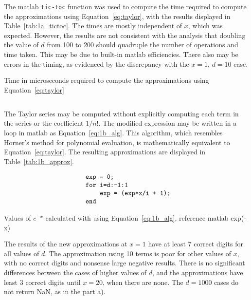 \documentclass[11pt]{article} %
\begin{document}
The matlab \verb!tic-toc! function was used to compute the time required to compute the approximations using  Equation~\ref{eq:taylor}, with the results displayed in Table~\ref{tab:1a_tictoc}. The times are mostly independent of $x$, which was expected. However, the results are not consistent with the analysis that doubling the value of $d$ from 100 to 200 should quadruple the number of operations and time taken. This may be due to built-in matlab efficiencies. There also may be errors in the timing, as evidenced by the discrepancy with the $x=1$, $d=10$ case.  

\begin{table}[h!]
\centering

\caption{Time in microseconds required to compute the approximations using Equation~\ref{eq:taylor}}
\label{tab:1a_tictoc}
\end{table}


\subsection{} %

The Taylor series may be computed without explicitly computing each term in the series or the coefficient $1/n!$. The modified expression may be written in a loop in matlab as Equation~\ref{eq:1b_alg}. This algorithm, which resembles Horner's method for polynomial evaluation, is mathematically equivalent to Equation~\ref{eq:taylor}. The resulting approximations are displayed in Table~\ref{tab:1b_approx}.

\begin{equation}
\begin{array}{l@{}l}
\verb!exp = 0;! \\
\verb!for i=d:-1:1! \\ 
\verb!    exp = (exp*x/i + 1);! \\
\verb!end!
\end{array}
\label{eq:1b_alg}
\end{equation}

\begin{table}[h!]
\centering


\caption{Values of $e^{-x}$ calculated with using Equation~\ref{eq:1b_alg}, reference matlab exp(-x)}
\label{tab:1b_approx}
\end{table}

The results of the new approximations at $x=1$ have at least 7 correct digits for all values of $d$. The  approximation using 10 terms is  poor for other values of $x$, with no correct digits and nonsense large negative results. There is no significant differences between the cases of higher values of $d$, and the approximations have least 3 correct digits until $x=20$, when there are none. The $d=1000$ cases do not return NaN, as in the part a).
\end{document}
